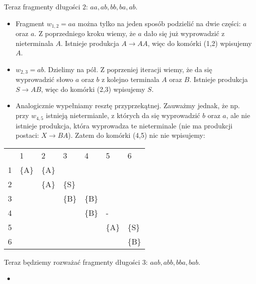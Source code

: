 Teraz fragmenty długości $2$: $aa, ab, bb, ba, ab$.
\begin{itemize}
\item Fragment $w_{1,2} = aa$ można tylko na jeden sposób podzielić na dwie części: $a$ oraz $a$. 
Z poprzedniego kroku wiemy, że $a$ dało się już wyprowadzić z nieterminala $A$.
Istnieje produkcja $A \rightarrow AA$, więc do komórki (1,2) wpisujemy $A$.
\item $w_{2,3} = ab$. Dzielimy na pół. Z poprzeniej iteracji wiemy, że da się wyprowadzić słowo $a$ oraz $b$ z kolejno terminala $A$ oraz $B$. Istnieje produkcja $S\rightarrow AB$, więc do komórki (2,3) wpisujemy $S$.
\item Analogicznie wypełniamy resztę przyprzekątnej. 
Zauważmy jednak, że np. przy $w_{4,5}$ istnieją nietermianle, z których da się wyprowadzić $b$ oraz $a$, ale nie istnieje produkcja, która wyprowadza te nieterminale (nie ma produkcji postaci: $ X \rightarrow BA$). 
Zatem do komórki (4,5) nic nie wpisujemy:
\end{itemize}

\begin{table}[h]
\centering
\label{my-label}
\begin{tabular}{lllllll}
                       & 1                          & 2                          & 3                          & 4                          & 5                          & 6                          \\ \cline{2-7} 
\multicolumn{1}{l|}{1} & \multicolumn{1}{l|}{\{A\}} & \multicolumn{1}{l|}{\{A\}} & \multicolumn{1}{l|}{}      & \multicolumn{1}{l|}{}      & \multicolumn{1}{l|}{}      & \multicolumn{1}{l|}{}      \\ \cline{2-7} 
\multicolumn{1}{l|}{2} & \multicolumn{1}{l|}{}      & \multicolumn{1}{l|}{\{A\}} & \multicolumn{1}{l|}{\{S\}} & \multicolumn{1}{l|}{}      & \multicolumn{1}{l|}{}      & \multicolumn{1}{l|}{}      \\ \cline{2-7} 
\multicolumn{1}{l|}{3} & \multicolumn{1}{l|}{}      & \multicolumn{1}{l|}{}      & \multicolumn{1}{l|}{\{B\}} & \multicolumn{1}{l|}{\{B\}} & \multicolumn{1}{l|}{}      & \multicolumn{1}{l|}{}      \\ \cline{2-7} 
\multicolumn{1}{l|}{4} & \multicolumn{1}{l|}{}      & \multicolumn{1}{l|}{}      & \multicolumn{1}{l|}{}      & \multicolumn{1}{l|}{\{B\}} & \multicolumn{1}{l|}{-}     & \multicolumn{1}{l|}{}      \\ \cline{2-7} 
\multicolumn{1}{l|}{5} & \multicolumn{1}{l|}{}      & \multicolumn{1}{l|}{}      & \multicolumn{1}{l|}{}      & \multicolumn{1}{l|}{}      & \multicolumn{1}{l|}{\{A\}} & \multicolumn{1}{l|}{\{S\}} \\ \cline{2-7} 
\multicolumn{1}{l|}{6} & \multicolumn{1}{l|}{}      & \multicolumn{1}{l|}{}      & \multicolumn{1}{l|}{}      & \multicolumn{1}{l|}{}      & \multicolumn{1}{l|}{}      & \multicolumn{1}{l|}{\{B\}} \\ \cline{2-7} 
\end{tabular}
\end{table}

Teraz będziemy rozważać fragmenty długości $3$: $aab, abb, bba, bab$. 
\begin{itemize}
\item 
\end{itemize}
